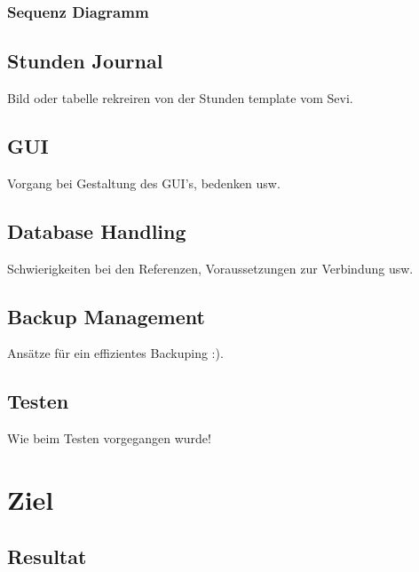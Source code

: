 \documentclass{article}
\begin{document}
\subsubsection{Sequenz Diagramm}

\subsection{Stunden Journal}
Bild oder tabelle rekreiren von der Stunden template vom Sevi.

\subsection{GUI}
Vorgang bei Gestaltung des GUI's, bedenken usw.

\subsection{Database Handling}
Schwierigkeiten bei den Referenzen, Voraussetzungen zur Verbindung usw.

\subsection{Backup Management}
Ansätze für ein effizientes Backuping :).

\subsection{Testen}
Wie beim Testen vorgegangen wurde!

\newpage

\section{Ziel}
\subsection{Resultat}
\end{document}
